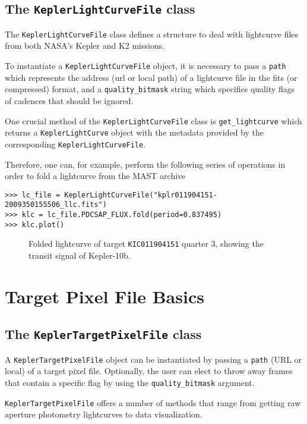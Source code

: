 \documentclass[twocolumn]{aastex62}
\begin{document}
   \subsection{The \texttt{KeplerLightCurveFile} class}
        The \texttt{KeplerLightCurveFile} class defines a structure to deal
        with lightcurve files from both NASA's Kepler and K2 missions.

        To instantiate a \texttt{KeplerLightCurveFile} object, it is necessary
        to pass a \texttt{path} which represents the address (url or local path)
        of a lightcurve file in the fits (or compressed) format, and a
        \texttt{quality\_bitmask} string which specifies quality
        flags of cadences that should be ignored.

        One crucial method of the \texttt{KeplerLightCurveFile} class is
        \texttt{get\_lightcurve} which returns a \texttt{KeplerLightCurve} object
        with the metadata provided by the corresponding \texttt{KeplerLightCurveFile}.

        Therefore, one can, for example, perform the following series of operations
        in order to fold a lightcurve from the MAST archive
\begin{verbatim}
>>> lc_file = KeplerLightCurveFile("kplr011904151-2009350155506_llc.fits")
>>> klc = lc_file.PDCSAP_FLUX.fold(period=0.837495)
>>> klc.plot()
\end{verbatim}

\begin{figure}
\caption{Folded lightcurve of target \texttt{KIC011904151} quarter 3, showing the
            transit signal of Kepler-10b.
\label{fig:fold-method}}
\end{figure}

\section{Target Pixel File Basics}
    \subsection{The \texttt{KeplerTargetPixelFile} class}
        A \texttt{KeplerTargetPixelFile} object can be instantiated
        by passing a \texttt{path} (URL or local) of a target pixel file.
        Optionally, the user can elect to throw away frames that contain
        a specific flag by using the \texttt{quality\_bitmask} argument.

        \texttt{KeplerTargetPixelFile} offers a number of methods
        that range from getting raw aperture photometry lightcurves to
        data visualization.
\end{document}
